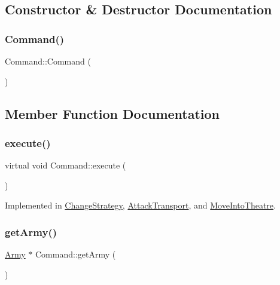 \subsection{Constructor \& Destructor Documentation}
\mbox{\label{class_command_a18df2d81039392daeb0b78c346a70537}} 
\subsubsection{\texorpdfstring{Command()}{Command()}}
{\footnotesize\ttfamily Command\+::\+Command (\begin{DoxyParamCaption}{ }\end{DoxyParamCaption})}



\subsection{Member Function Documentation}
\mbox{\label{class_command_a6fd7d9bd8df8bfc881e4d6c7cd1878b7}} 
\subsubsection{\texorpdfstring{execute()}{execute()}}
{\footnotesize\ttfamily virtual void Command\+::execute (\begin{DoxyParamCaption}{ }\end{DoxyParamCaption})\hspace{0.3cm}{\ttfamily [pure virtual]}}



Implemented in \mbox{\hyperlink{class_change_strategy_a3d93f81a8f2a98a978120eaaff18aecd}{Change\+Strategy}}, \mbox{\hyperlink{class_attack_transport_a9fc5c19e5103ecb3e71dbfb21ad1fef9}{Attack\+Transport}}, and \mbox{\hyperlink{class_move_into_theatre_a4e708f54f8edabcb6be4164c1d38adcf}{Move\+Into\+Theatre}}.

\mbox{\label{class_command_a3e19da141499cf156f3a8ecbf2a168ce}} 
\subsubsection{\texorpdfstring{getArmy()}{getArmy()}}
{\footnotesize\ttfamily \mbox{\hyperlink{class_army}{Army}} $\ast$ Command\+::get\+Army (\begin{DoxyParamCaption}{ }\end{DoxyParamCaption})}



